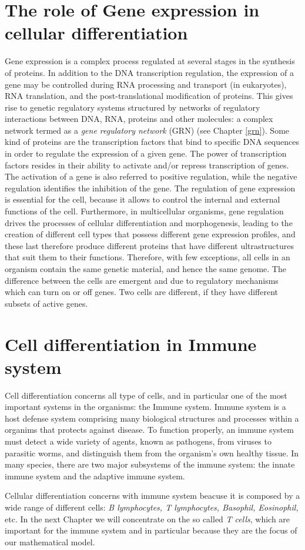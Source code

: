 \section{The role of Gene expression in cellular differentiation}
Gene expression is a complex process regulated at several stages in the synthesis of proteins. In addition to the DNA transcription regulation, the expression of a gene may be controlled during RNA processing and transport (in eukaryotes), RNA translation, and the post-translational modification of proteins. This gives rise to genetic regulatory systems structured by networks of regulatory interactions between DNA, RNA, proteins and other molecules: a complex network termed as a \emph{gene regulatory
network} (GRN) (see Chapter \ref{grn}). Some kind of proteins are the transcription factors that bind to specific DNA sequences in order to regulate the
expression of a given gene. The power of transcription factors resides in their ability to activate and/or repress transcription of genes. The activation of
a gene is also referred to positive regulation, while the negative regulation
identifies the inhibition of the gene.
The regulation of gene expression is essential for the cell, because it
allows to control the internal and external functions of the cell. Furthermore,
in multicellular organisms, gene regulation drives the processes of cellular
differentiation and morphogenesis, leading to the creation of different cell
types that possess different gene expression profiles, and these last therefore
produce different proteins that have different ultrastructures that suit them
to their functions. Therefore, with few exceptions, all cells in an
organism contain the same genetic material, and hence the same genome. The difference between the cells are emergent and due to regulatory mechanisms which can turn on or off genes. Two cells are different, if they have different subsets of active genes.

\section{Cell differentiation in Immune system}
Cell differentiation concerns all type of cells, and in particular one of the most important systems in the organisms: the Immune system. 
Immune  system is a host defense system comprising many biological structures and processes within a organims that protects against disease.
To function properly, an immune system must detect a wide variety of agents, known as pathogens, from viruses to parasitic worms, and distinguish them from the organism's own healthy tissue. In many species, there are two major subsystems of the immune system: the innate immune system and the adaptive immune system.

Cellular differentiation concerns with immune system beacuse it is composed by a wide range of different cells: \emph{B lymphocytes, T lymphocytes, Basophil, Eosinophil,} etc. In the next Chapter we will concentrate on the so called \emph{T cells}, which are important for the immune system and in particular because they are the focus of our mathematical model.

